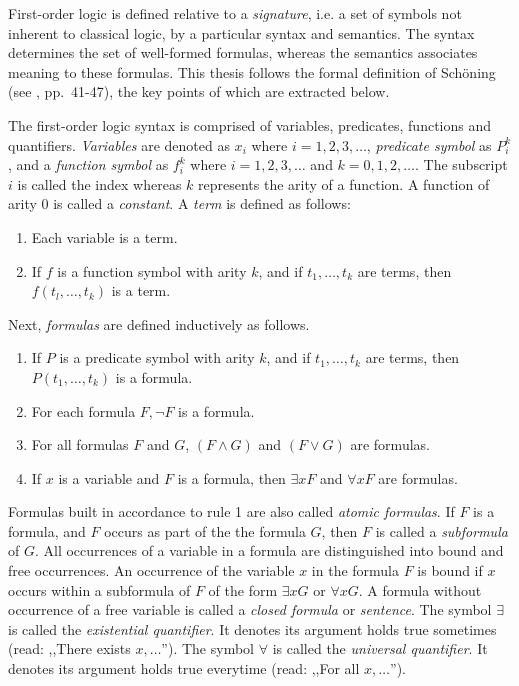 First-order logic is defined relative to a \textit{signature}, i.e. a set of symbols not inherent to classical logic, by a particular syntax and semantics.
The syntax determines the set of well-formed formulas, whereas the semantics associates meaning to these formulas.
This thesis follows the formal definition of Schöning (see \cite{schoning2008logic}, pp.~41-47), the key points of which are extracted below.

The first-order logic syntax is comprised of variables, predicates, functions and quantifiers.
\textit{Variables} are denoted as $x_i$ where $i= 1, 2, 3, \ldots$, \textit{predicate symbol} as $P_i^k$, and a \textit{function symbol} as $f_i^k$ where $i = 1, 2, 3 , \ldots$ and $k = 0, 1, 2, \ldots$.
The subscript $i$ is called the index whereas $k$ represents the arity of a function.
A function of arity 0 is called a \textit{constant}.
A \textit{term} is defined as follows:

\begin{enumerate}
    \item Each variable is a term.
    \item If $f$ is a function symbol with arity $k$, and if $t_1, \ldots, t_k$ are terms, then $f(t_l, \ldots, t_k)$ is a term.
\end{enumerate}

\noindent
Next, \textit{formulas} are defined inductively as follows.

\begin{enumerate}
    \item If $P$ is a predicate symbol with arity $k$, and if $t_1, \ldots ,t_k$ are terms, then $P(t_1 , \ldots, t_k )$ is a formula.
    \item For each formula $F, \lnot F$ is a formula.
    \item For all formulas $F$ and $G$, $(F \wedge G)$ and $(F \vee G)$ are formulas.
    \item If $x$ is a variable and $F$ is a formula, then $\exists xF$ and $\forall xF$ are formulas.
\end{enumerate}

Formulas built in accordance to rule 1 are also called \textit{atomic formulas}.
If $F$ is a formula, and $F$ occurs as part of the the formula $G$, then $F$ is called a \textit{subformula} of $G$.
All occurrences of a variable in a formula are distinguished into bound and free occurrences.
An occurrence of the variable $x$ in the formula $F$ is bound if $x$ occurs within a subformula of $F$ of the form $\exists xG$ or $\forall xG$.
A formula without occurrence of a free variable is called a \textit{closed formula} or \textit{sentence}.
The symbol $\exists$ is called the \textit{existential quantifier}.
It denotes its argument holds true sometimes (read: ,,There exists $x, \ldots$'').
The symbol $\forall$ is called the \textit{universal quantifier}.
It denotes its argument holds true everytime (read: ,,For all $x, \ldots$'').

